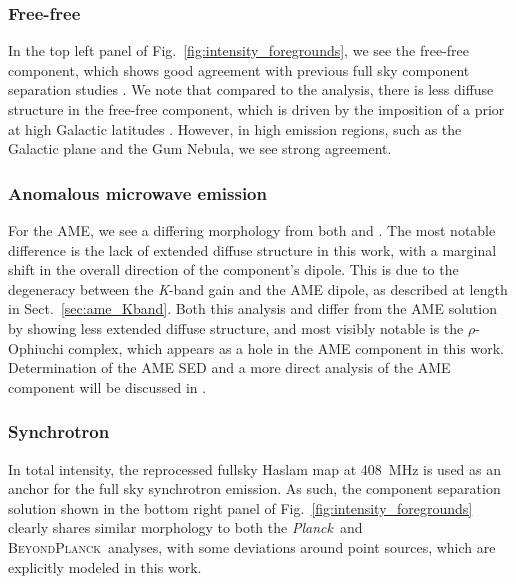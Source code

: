 \documentclass[twocolumn]{../../common/aa}
\def\Planck{\emph{Planck}}
\newcommand{\BP}{\textsc{BeyondPlanck}}
\newcommand{\K}[0]{\textit K}
\begin{document}
\subsubsection{Free-free}\label{subsubsec:ff}

In the top left panel of Fig.~\ref{fig:intensity_foregrounds}, we see the free-free component, which shows good agreement with previous full sky component separation studies \citep{planck2014-a12,bp13}. We note that compared to the \cite{planck2014-a12} analysis, there is less diffuse structure in the free-free component, which is driven by the imposition of a prior at high Galactic latitudes \citep{bp13}. However, in high emission regions, such as the Galactic plane and the Gum Nebula, we see strong agreement.

\subsubsection{Anomalous microwave emission}\label{subsubsec:ame}

For the AME, we see a differing morphology from both \cite{planck2014-a12} and \cite{bp13}. The most notable difference is the lack of extended diffuse structure in this work, with a marginal shift in the overall direction of the component's dipole. This is due to the degeneracy between the \K-band gain and the AME dipole, as described at length in Sect.~\ref{sec:ame_Kband}. Both this analysis and \cite{bp13} differ from the \cite{planck2014-a12} AME solution by showing less extended diffuse structure, and most visibly notable is the $\rho$-Ophiuchi complex, which appears as a hole in the AME component in this work.  Determination of the AME SED and a more direct analysis of the AME component will be discussed in \citet{watts2023_ame}.

\subsubsection{Synchrotron}\label{subsub:synch}

In total intensity, the reprocessed fullsky Haslam map \citep{remazeilles2014} at 408~MHz is used as an anchor for the full sky synchrotron emission. As such, the component separation solution shown in the bottom right panel of Fig.~\ref{fig:intensity_foregrounds} clearly shares similar morphology to both the \Planck\ and \BP\ analyses, with some deviations around point sources, which are explicitly modeled in this work. 
\end{document}
